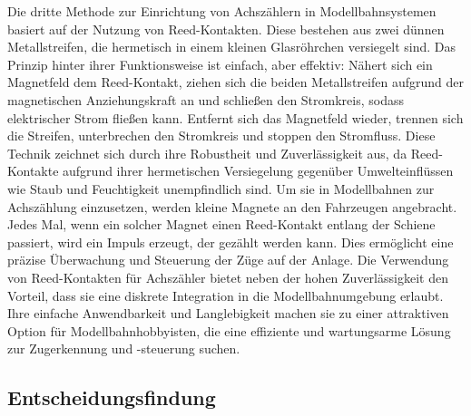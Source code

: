 Die dritte Methode zur Einrichtung von Achszählern in Modellbahnsystemen basiert auf der Nutzung von Reed-Kontakten. Diese bestehen aus zwei dünnen Metallstreifen, die hermetisch in einem kleinen Glasröhrchen versiegelt sind. Das Prinzip hinter ihrer Funktionsweise ist einfach, aber effektiv: Nähert sich ein Magnetfeld dem Reed-Kontakt, ziehen sich die beiden Metallstreifen aufgrund der magnetischen Anziehungskraft an und schließen den Stromkreis, sodass elektrischer Strom fließen kann. Entfernt sich das Magnetfeld wieder, trennen sich die Streifen, unterbrechen den Stromkreis und stoppen den Stromfluss.
\newline
Diese Technik zeichnet sich durch ihre Robustheit und Zuverlässigkeit aus, da Reed-Kontakte aufgrund ihrer hermetischen Versiegelung gegenüber Umwelteinflüssen wie Staub und Feuchtigkeit unempfindlich sind. Um sie in Modellbahnen zur Achszählung einzusetzen, werden kleine Magnete an den Fahrzeugen angebracht. Jedes Mal, wenn ein solcher Magnet einen Reed-Kontakt entlang der Schiene passiert, wird ein Impuls erzeugt, der gezählt werden kann. Dies ermöglicht eine präzise Überwachung und Steuerung der Züge auf der Anlage.
\newline
Die Verwendung von Reed-Kontakten für Achszähler bietet neben der hohen Zuverlässigkeit den Vorteil, dass sie eine diskrete Integration in die Modellbahnumgebung erlaubt. Ihre einfache Anwendbarkeit und Langlebigkeit machen sie zu einer attraktiven Option für Modellbahnhobbyisten, die eine effiziente und wartungsarme Lösung zur Zugerkennung und -steuerung suchen.

\subsection{Entscheidungsfindung}\label{text:Methodik:Achszähler:Entscheidungsfindung}

